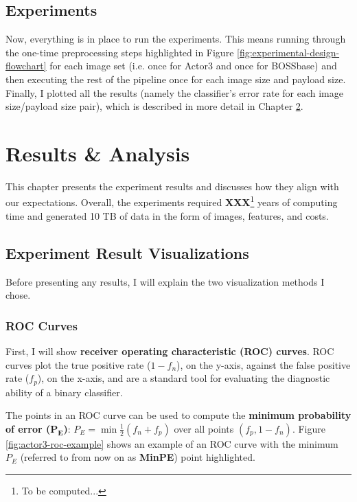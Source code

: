\documentclass[11pt,a4paper,twoside,openright]{report}
\begin{document}
\section{Experiments}

Now, everything is in place to run the experiments. This means running through the one-time preprocessing steps highlighted in Figure \ref{fig:experimental-design-flowchart} for each image set (i.e. once for Actor3 and once for BOSSbase) and then executing the rest of the pipeline once for each image size and payload size. Finally, I plotted all the results (namely the classifier's error rate for each image size/payload size pair), which is described in more detail in Chapter \ref{chap:results}.


\chapter{Results \& Analysis} \label{chap:results}

This chapter presents the experiment results and discusses how they align with our expectations. Overall, the experiments required \textbf{XXX}\footnote{To be computed...} years of computing time and generated 10 TB of data in the form of images, features, and costs.


\section{Experiment Result Visualizations}

Before presenting any results, I will explain the two visualization methods I chose.


\subsection{ROC Curves} \label{sec:roc-curves}

First, I will show \textbf{receiver operating characteristic (ROC) curves}. ROC curves plot the true positive rate ($1-f_n$), on the y-axis, against the false positive rate ($f_p$), on the x-axis, and are a standard tool for evaluating the diagnostic ability of a binary classifier.

The points in an ROC curve can be used to compute the \textbf{minimum probability of error ($\bm{P_E}$)}: $P_E = \min{\frac{1}{2}(f_n+f_p)}$ over all points $(f_p, 1-f_n)$. Figure \ref{fig:actor3-roc-example} shows an example of an ROC curve with the minimum $P_E$ (referred to from now on as \textbf{MinPE}) point highlighted.
\end{document}
